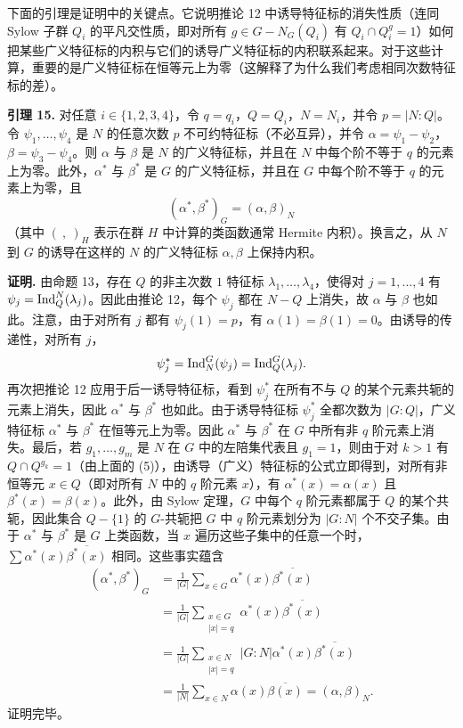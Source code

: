 下面的引理是证明中的关键点。它说明推论 12 中诱导特征标的消失性质（连同 Sylow 子群 $Q_i$ 的平凡交性质，即对所有 $g\in G-N_G(Q_i)$ 有 $Q_i\cap Q_i^g=1$）如何把某些广义特征标的内积与它们的诱导广义特征标的内积联系起来。对于这些计算，重要的是广义特征标在恒等元上为零（这解释了为什么我们考虑相同次数特征标的差）。

\noindent\textbf{引理 15.} 对任意 $i\in\{1,2,3,4\}$，令 $q=q_i$，$Q=Q_i$，$N=N_i$，并令 $p=|N:Q|$。令 $\psi_1,\ldots,\psi_4$ 是 $N$ 的任意次数 $p$ 不可约特征标（不必互异），并令 $\alpha=\psi_1-\psi_2$，$\beta=\psi_3-\psi_4$。则 $\alpha$ 与 $\beta$ 是 $N$ 的广义特征标，并且在 $N$ 中每个阶不等于 $q$ 的元素上为零。此外，$\alpha^*$ 与 $\beta^*$ 是 $G$ 的广义特征标，并且在 $G$ 中每个阶不等于 $q$ 的元素上为零，且
\[
  (\alpha^*,\beta^*)_G=(\alpha,\beta)_N
\]
（其中 $(\ ,\ )_H$ 表示在群 $H$ 中计算的类函数通常 Hermite 内积）。换言之，从 $N$ 到 $G$ 的诱导在这样的 $N$ 的广义特征标 $\alpha,\beta$ 上保持内积。

\noindent\textbf{证明.} 由命题 13，存在 $Q$ 的非主次数 $1$ 特征标 $\lambda_1,\ldots,\lambda_4$，使得对 $j=1,\ldots,4$ 有 $\psi_j=\operatorname{Ind}_Q^N(\lambda_j)$。因此由推论 12，每个 $\psi_j$ 都在 $N-Q$ 上消失，故 $\alpha$ 与 $\beta$ 也如此。注意，由于对所有 $j$ 都有 $\psi_j(1)=p$，有 $\alpha(1)=\beta(1)=0$。由诱导的传递性，对所有 $j$，
\[
  \psi_j^*=\operatorname{Ind}_N^G(\psi_j)=\operatorname{Ind}_Q^G(\lambda_j).
\]
再次把推论 12 应用于后一诱导特征标，看到 $\psi_j^*$ 在所有不与 $Q$ 的某个元素共轭的元素上消失，因此 $\alpha^*$ 与 $\beta^*$ 也如此。由于诱导特征标 $\psi_j^*$ 全都次数为 $|G:Q|$，广义特征标 $\alpha^*$ 与 $\beta^*$ 在恒等元上为零。因此 $\alpha^*$ 与 $\beta^*$ 在 $G$ 中所有非 $q$ 阶元素上消失。最后，若 $g_1,\ldots,g_m$ 是 $N$ 在 $G$ 中的左陪集代表且 $g_1=1$，则由于对 $k>1$ 有 $Q\cap Q^{g_k}=1$（由上面的 (5)），由诱导（广义）特征标的公式立即得到，对所有非恒等元 $x\in Q$（即对所有 $N$ 中的 $q$ 阶元素 $x$），有 $\alpha^*(x)=\alpha(x)$ 且 $\beta^*(x)=\beta(x)$。此外，由 Sylow 定理，$G$ 中每个 $q$ 阶元素都属于 $Q$ 的某个共轭，因此集合 $Q-\{1\}$ 的 $G$-共轭把 $G$ 中 $q$ 阶元素划分为 $|G:N|$ 个不交子集。由于 $\alpha^*$ 与 $\beta^*$ 是 $G$ 上类函数，当 $x$ 遍历这些子集中的任意一个时，$\sum \alpha^*(x)\overline{\beta^*(x)}$ 相同。这些事实蕴含
\[
\begin{aligned}
  (\alpha^*,\beta^*)_G
  &=\frac1{|G|}\sum_{x\in G}\alpha^*(x)\overline{\beta^*(x)}\\
  &=\frac1{|G|}\sum_{\substack{x\in G\\ |x|=q}}\alpha^*(x)\overline{\beta^*(x)}\\
  &=\frac1{|G|}\sum_{\substack{x\in N\\ |x|=q}} |G:N|\alpha^*(x)\overline{\beta^*(x)}\\
  &=\frac1{|N|}\sum_{x\in N}\alpha(x)\overline{\beta(x)}=(\alpha,\beta)_N.
\end{aligned}
\]
证明完毕。

